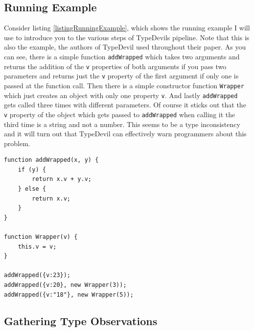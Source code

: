 \documentclass[runningheads,a4paper]{llncs}
\begin{document}
\subsection{Running Example}
Consider listing \ref{listingRunningExample}, which shows the running example I will use to introduce you to the various steps of TypeDevils pipeline.
Note that this is also the example, the authors of TypeDevil used throughout their paper.
As you can see, there is a simple function \lstinline[columns=fixed]{addWrapped} which takes two arguments and returns the addition of the \lstinline[columns=fixed]{v} properties of both arguments if you pass two parameters and returns just the \lstinline[columns=fixed]{v} property of the first argument if only one is passed at the function call.
Then there is a simple constructor function \lstinline[columns=fixed]{Wrapper} which just creates an object with only one property \lstinline[columns=fixed]{v}.
And lastly \lstinline[columns=fixed]{addWrapped} gets called three times with different parameters.
Of course it sticks out that the \lstinline[columns=fixed]{v} property of the object which gets passed to \lstinline[columns=fixed]{addWrapped} when calling it the third time is a string and not a number.
This seems to be a type inconsistency and it will turn out that TypeDevil can effectively warn programmers about this problem.

\medskip\medskip
\lstset{language=javascript}
\begin{minipage}{\linewidth}
\begin{lstlisting}[frame=single, caption=Running Example, label=listingRunningExample]
function addWrapped(x, y) {
    if (y) {
        return x.v + y.v;
    } else {
        return x.v;
    }
}

function Wrapper(v) {
    this.v = v;
}

addWrapped({v:23});
addWrapped({v:20}, new Wrapper(3));
addWrapped({v:"18"}, new Wrapper(5));
\end{lstlisting}
\end{minipage}


\subsection{Gathering Type Observations}
\end{document}
